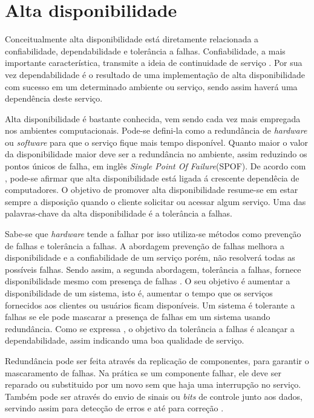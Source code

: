 \chapter{Alta disponibilidade}
Conceitualmente alta disponibilidade está diretamente relacionada a confiabilidade, dependabilidade e tolerância a falhas. 
Confiabilidade, a mais importante característica, transmite a ideia de continuidade de serviço \cite{pankaj1994}.
Por sua vez dependabilidade é o resultado de uma implementação de alta disponibilidade com sucesso em um determinado ambiente ou serviço,
sendo assim haverá uma dependência deste serviço.

Alta disponibilidade é bastante conhecida, vem sendo cada vez mais empregada nos ambientes computacionais.
Pode-se defini-la como a redundância de \textit{hardware} ou \textit{software} para que o serviço fique mais tempo disponível.
Quanto maior o valor da disponibilidade maior deve ser a redundância no ambiente, assim reduzindo os pontos únicos de falha,
em inglês \textit{Single Point Of Failure}(SPOF).
De acordo com \cite{costa2009}, pode-se afirmar que alta disponibilidade está ligada á crescente dependêcia de computadores.
O objetivo de promover alta disponibilidade resume-se em estar sempre a disposição quando o cliente solicitar ou acessar algum serviço.
Uma das palavras-chave da alta disponibilidade é a tolerância a falhas.

Sabe-se que \textit{hardware} tende a falhar por isso utiliza-se métodos como prevenção de falhas e tolerância a falhas.
A abordagem prevenção de falhas melhora a disponibilidade e a confiabilidade de um serviço porém, não resolverá todas as possíveis falhas.
Sendo assim, a segunda abordagem, tolerância a falhas, fornece disponibilidade mesmo com presença de falhas \cite{pankaj1994}.
O seu objetivo é aumentar a disponibilidade de um sistema, isto é, 
aumentar o tempo que os serviços fornecidos aos clientes ou usuários ficam disponíveis. 
Um sistema é tolerante a falhas se ele pode mascarar a presença de falhas em um sistema usando redundância. Como se expressa \cite{costa2009}, 
o objetivo da tolerância a falhas é alcançar a dependabilidade, assim indicando uma boa qualidade de serviço.

Redundância pode ser feita através da replicação de componentes, para garantir o mascaramento de falhas.
Na prática se um componente falhar, ele deve ser reparado ou substituido por um novo sem que haja uma interrupção no serviço.
Também pode ser através do envio de sinais ou \textit{bits} de controle junto aos dados, 
servindo assim para detecção de erros e até para correção \cite{weber2002}.

